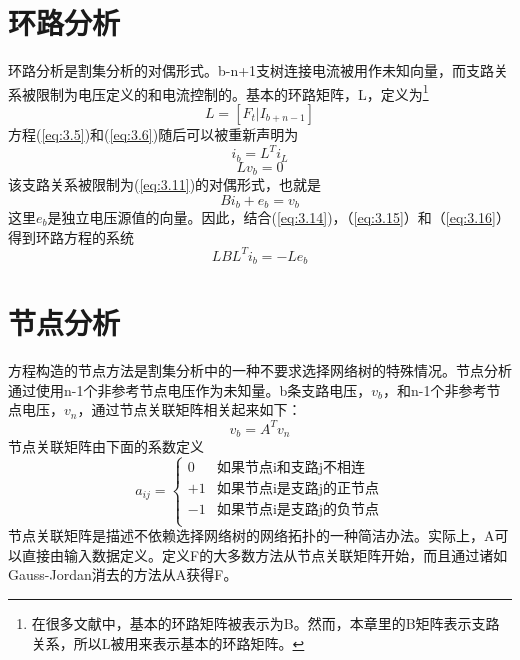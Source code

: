 \section{环路分析}
环路分析是割集分析的对偶形式。b-n+1支树连接电流被用作未知向量，而支路关系被限制为电压定义的和电流控制的。基本的环路矩阵，L，定义为\footnote{在很多文献中\cite{ref-7}，基本的环路矩阵被表示为B。然而，本章里的B矩阵表示支路关系，所以L被用来表示基本的环路矩阵。}
\begin{equation}
    L=[F_t|I_{b+n-1}]
    \label{eq:3.13}
\end{equation}
方程(\ref{eq:3.5})和(\ref{eq:3.6})随后可以被重新声明为
\begin{equation}
    i_b = L^Ti_L
    \label{eq:3.14}
\end{equation}
\begin{equation}
    Lv_b= 0
    \label{eq:3.15}
\end{equation}
该支路关系被限制为(\ref{eq:3.11})的对偶形式，也就是
\begin{equation}
    Bi_b +e_b = v_b
    \label{eq:3.16}
\end{equation}
这里$e_b$是独立电压源值的向量。因此，结合(\ref{eq:3.14})，（\ref{eq:3.15}）和（\ref{eq:3.16}）得到环路方程的系统
\begin{equation}
    LBL^Ti_b = -Le_b
    \label{eq:3.17}
\end{equation}

\section{节点分析}
方程构造的节点方法是割集分析中的一种不要求选择网络树的特殊情况。节点分析通过使用n-1个非参考节点电压作为未知量。b条支路电压，$v_b$，和n-1个非参考节点电压，$v_n$，通过节点关联矩阵相关起来如下：
\begin{equation}
    v_b = A^Tv_n
    \label{eq:3.18}
\end{equation}
节点关联矩阵由下面的系数定义
\begin{equation*}
 a_{ij}=\left\{\begin{matrix}
0 & \text{如果节点i和支路j不相连} \\
+1 & \text{如果节点i是支路j的正节点} \\
-1 & \text{如果节点i是支路j的负节点} \\
\end{matrix}\right.   
\end{equation*}
节点关联矩阵是描述不依赖选择网络树的网络拓扑的一种简洁办法。实际上，A可以直接由输入数据定义。定义F的大多数方法从节点关联矩阵开始，而且通过诸如Gauss-Jordan消去\cite{ref-29}的方法从A获得F。


